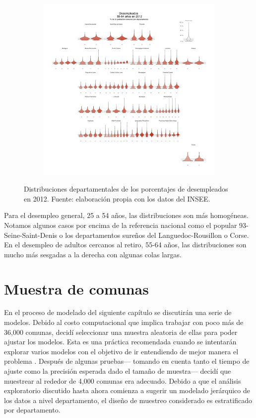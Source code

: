 \begin{figure}[H]
\begin{subfigure}{0.3\textwidth}
	\end{subfigure}~
	\begin{subfigure}{0.3\textwidth}
	\includegraphics[width = \textwidth]{Figs/AED/Geofacet_Distr_por_Dpto_Des3_2012}
	\end{subfigure}
	\caption{Distribuciones departamentales de los porcentajes de desempleados en 2012. Fuente: elaboración propia con los datos del INSEE.}
	\label{fig:Distr_por_Dpto_Ocu_2012}	
\end{figure}

Para el desempleo general, 25 a 54 años, las distribuciones son más homogéneas. Notamos algunos casos por encima de la referencia nacional como el popular 93-Seine-Saint-Denis o los departamentos sureños del Languedoc-Rousillon o Corse. En el desempleo de adultos cercanos al retiro, 55-64 años, las distribuciones son mucho más sesgadas a la derecha con algunas colas largas. 

\section{Muestra de comunas}\label{secc:muestra}

En el proceso de modelado del siguiente capítulo se discutirán una serie de modelos. Debido al costo computacional que implica trabajar con poco más de 36,000 comunas, decidí seleccionar una muestra aleatoria de ellas para poder ajustar los modelos. Esta es una práctica recomendada cuando se intentarán explorar varios modelos con el objetivo de ir entendiendo de mejor manera el problema \parencite{GelmanHill06}. Después de algunas pruebas--- tomando en cuenta tanto el tiempo de ajuste como la precisión esperada dado el tamaño de muestra--- decidí que muestrear al rededor de 4,000 comunas era adecuado. Debido a que el análisis exploratorio discutido hasta ahora comienza a sugerir un modelado jerárquico de los datos a nivel departamento, el diseño de muestreo considerado es estratificado por departamento.\\ 

